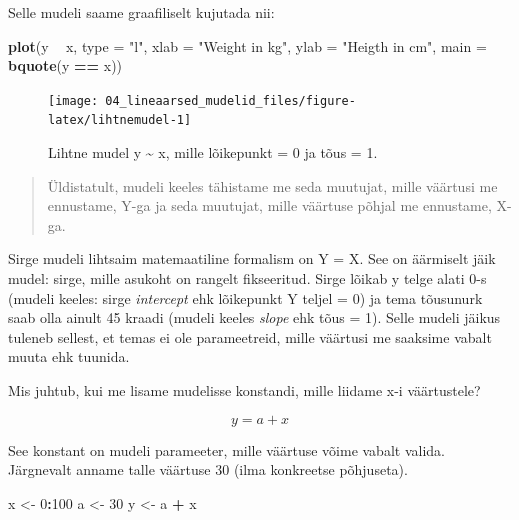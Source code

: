\documentclass[]{book}
\newenvironment{Shaded}{\begin{snugshade}}{\end{snugshade}}
\newcommand{\KeywordTok}[1]{\textcolor[rgb]{0.13,0.29,0.53}{\textbf{#1}}}
\newcommand{\DataTypeTok}[1]{\textcolor[rgb]{0.13,0.29,0.53}{#1}}
\newcommand{\DecValTok}[1]{\textcolor[rgb]{0.00,0.00,0.81}{#1}}
\newcommand{\StringTok}[1]{\textcolor[rgb]{0.31,0.60,0.02}{#1}}
\newcommand{\OperatorTok}[1]{\textcolor[rgb]{0.81,0.36,0.00}{\textbf{#1}}}
\newcommand{\NormalTok}[1]{#1}
\begin{document}
Selle mudeli saame graafiliselt kujutada nii:




\begin{Shaded}
\begin{Highlighting}[]
\KeywordTok{plot}\NormalTok{(y }\OperatorTok{~}\StringTok{ }\NormalTok{x, }
     \DataTypeTok{type =} \StringTok{"l"}\NormalTok{, }
     \DataTypeTok{xlab =} \StringTok{"Weight in kg"}\NormalTok{, }
     \DataTypeTok{ylab =} \StringTok{"Heigth in cm"}\NormalTok{, }
     \DataTypeTok{main =} \KeywordTok{bquote}\NormalTok{(y }\OperatorTok{==}\StringTok{ }\NormalTok{x))}
\end{Highlighting}
\end{Shaded}

\begin{figure}

{\centering \texttt{[image: 04\_lineaarsed\_mudelid\_files/figure-latex/lihtnemudel-1]} 

}

\caption{Lihtne mudel y \textasciitilde{} x, mille lõikepunkt =
0 ja tõus = 1.}\label{fig:lihtnemudel}
\end{figure}

\begin{quote}
Üldistatult, mudeli keeles tähistame me seda muutujat, mille väärtusi me
ennustame, Y-ga ja seda muutujat, mille väärtuse põhjal me ennustame,
X-ga.
\end{quote}

Sirge mudeli lihtsaim matemaatiline formalism on Y = X. See on äärmiselt
jäik mudel: sirge, mille asukoht on rangelt fikseeritud. Sirge lõikab y
telge alati 0-s (mudeli keeles: sirge \emph{intercept} ehk lõikepunkt Y
teljel = 0) ja tema tõusunurk saab olla ainult 45 kraadi (mudeli keeles
\emph{slope} ehk tõus = 1). Selle mudeli jäikus tuleneb sellest, et
temas ei ole parameetreid, mille väärtusi me saaksime vabalt muuta ehk
tuunida.

Mis juhtub, kui me lisame mudelisse konstandi, mille liidame x-i
väärtustele?

\[y = a + x\]

See konstant on mudeli parameeter, mille väärtuse võime vabalt valida.
Järgnevalt anname talle väärtuse 30 (ilma konkreetse põhjuseta).

\begin{Shaded}
\begin{Highlighting}[]
\NormalTok{x <-}\StringTok{ }\DecValTok{0}\OperatorTok{:}\DecValTok{100} 
\NormalTok{a <-}\StringTok{ }\DecValTok{30}
\NormalTok{y <-}\StringTok{ }\NormalTok{a }\OperatorTok{+}\StringTok{ }\NormalTok{x}
\end{Highlighting}
\end{Shaded}
\end{document}
